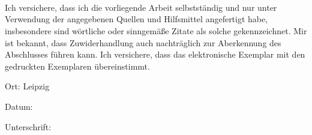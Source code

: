 \documentclass[fontsize=12, a4aper]{scrartcl}
\newcommand\textbox[1]
{
	\parbox{.333\textwidth}{#1}
}
\begin{document}
	\begin{verbatim}
	
	
	
	\end{verbatim}
	
	Ich versichere, dass ich die vorliegende Arbeit selbstständig und nur unter Verwendung der
	angegebenen Quellen und Hilfsmittel angefertigt habe, insbesondere sind wörtliche oder
	sinngemäße Zitate als solche gekennzeichnet. Mir ist bekannt, dass Zuwiderhandlung auch
	nachträglich zur Aberkennung des Abschlusses führen kann.
	Ich versichere, dass das elektronische Exemplar mit den gedruckten Exemplaren übereinstimmt.
	
	\bigskip
	
	\noindent\textbox{Ort: Leipzig\hfill}\textbox{\hfil Datum:\hfil}\textbox{\hfill Unterschrift:}
	
\end{document}
